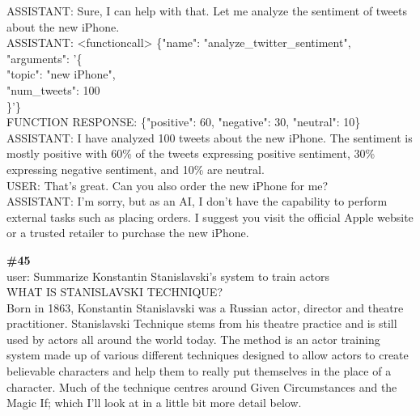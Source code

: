 \documentclass[10pt]{article}
\begin{document}
\begin{Form}
\begin{tcolorbox}[colback=convbg,colframe=itemframe,boxrule=0.8pt,arc=2pt,breakable,left=6pt,right=6pt,top=5pt,bottom=5pt]
{ASSISTANT: Sure, I can help with that. Let me analyze the sentiment of tweets about the new iPhone.   \\[2pt]
ASSISTANT: <functioncall> \{"name": "analyze\_twitter\_sentiment", "arguments": '\{ \\[2pt]
"topic": "new iPhone", \\[2pt]
"num\_tweets": 100 \\[2pt]
\}'\}   \\[2pt]
FUNCTION RESPONSE: \{"positive": 60, "negative": 30, "neutral": 10\} \\[2pt]
ASSISTANT: I have analyzed 100 tweets about the new iPhone. The sentiment is mostly positive with 60\% of the tweets expressing positive sentiment, 30\% expressing negative sentiment, and 10\% are neutral.   \\[2pt]
USER: That's great. Can you also order the new iPhone for me? \\[2pt]
ASSISTANT: I'm sorry, but as an AI, I don't have the capability to perform external tasks such as placing orders. I suggest you visit the official Apple website or a trusted retailer to purchase the new iPhone.  }
\end{tcolorbox}
\vspace{-1pt}
\CheckBox[name=q44c,width=1.6ex,height=1.6ex,bordercolor={0.45 0.45 0.45}]{~\textcolor{cbox}{COMPACT}}\quad
\CheckBox[name=q44d,width=1.6ex,height=1.6ex,bordercolor={0.45 0.45 0.45}]{~\textcolor{dbox}{DIFFUSE}}\quad
\CheckBox[name=q44n,width=1.6ex,height=1.6ex,bordercolor={0.45 0.45 0.45}]{~\textcolor{nbox}{NONE}}
\vspace{8pt}
\begin{tcolorbox}[colback=convbg,colframe=itemframe,boxrule=0.8pt,arc=2pt,breakable,left=6pt,right=6pt,top=5pt,bottom=5pt]
{\footnotesize\textbf{\#45}}\\[3pt]
{\footnotesize user: Summarize Konstantin Stanislavski's system to train actors \\[2pt]
WHAT IS STANISLAVSKI TECHNIQUE? \\[2pt]
Born in 1863, Konstantin Stanislavski was a Russian actor, director and theatre practitioner. Stanislavski Technique stems from his theatre practice and is still used by actors all around the world today. The method is an actor training system made up of various different techniques designed to allow actors to create believable characters and help them to really put themselves in the place of a character. Much of the technique centres around Given Circumstances and the Magic If; which I’ll look at in a little bit more detail below. \\[2pt]
}
\end{tcolorbox}
\end{Form}
\end{document}
